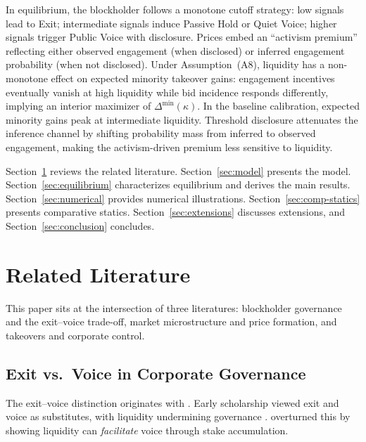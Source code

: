\documentclass[11pt]{article}
\newcommand{\1}{\mathbf{1}}
\begin{document}
In equilibrium, the blockholder follows a monotone cutoff strategy: low signals lead to Exit; intermediate signals induce Passive Hold or Quiet Voice; higher signals trigger Public Voice with disclosure. Prices embed an ``activism premium'' reflecting either observed engagement (when disclosed) or inferred engagement probability (when not disclosed). Under Assumption~\textup{(A8)}, liquidity has a non-monotone effect on expected minority takeover gains: engagement incentives eventually vanish at high liquidity while bid incidence responds differently, implying an interior maximizer of $\Delta^{\min}(\kappa)$. In the baseline calibration, expected minority gains peak at intermediate liquidity. Threshold disclosure attenuates the inference channel by shifting probability mass from inferred to observed engagement, making the activism-driven premium less sensitive to liquidity.

Section~\ref{sec:lit} reviews the related literature. Section~\ref{sec:model} presents the model. Section~\ref{sec:equilibrium} characterizes equilibrium and derives the main results. Section~\ref{sec:numerical} provides numerical illustrations. Section~\ref{sec:comp-statics} presents comparative statics. Section~\ref{sec:extensions} discusses extensions, and Section~\ref{sec:conclusion} concludes.

\section{Related Literature}
\label{sec:lit}

This paper sits at the intersection of three literatures: blockholder governance and the exit--voice trade-off, market microstructure and price formation, and takeovers and corporate control.

\subsection{Exit vs.\ Voice in Corporate Governance}

The exit--voice distinction originates with \citet{Hirschman1970}. Early scholarship viewed exit and voice as substitutes, with liquidity undermining governance \citep{Coffee1991,Bhide1993}. \citet{Maug1998} overturned this by showing liquidity can \emph{facilitate} voice through stake accumulation.
\end{document}
